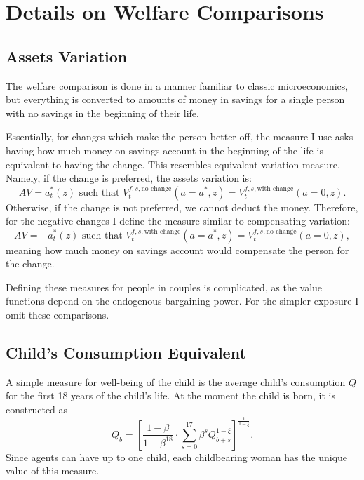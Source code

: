 \documentclass[12pt,letter]{article}
\begin{document}
\section{Details on Welfare Comparisons\label{welfare-details}}
\subsection{Assets Variation}
The welfare comparison is done in a manner familiar to classic microeconomics, but everything is converted to amounts of money in savings for a single person with no savings in the beginning of their life.

Essentially, for changes which make the person better off, the measure I use asks having how much money on savings account in the beginning of the life is equivalent to having the change. This resembles equivalent variation measure. Namely, if the change is preferred, the assets variation is:
\[AV = a^*_t(z) \text{ such that } V_{t}^{f,s,\text{no change}}(a=a^*,z) = V_{t}^{f,s,\text{with change}}(a=0,z).\]
Otherwise, if the change is not preferred, we cannot deduct the money. Therefore, for the negative changes I define the measure similar to compensating variation:
\[AV = -a^*_t(z) \text{ such that } V_{t}^{f,s,\text{with change}}(a=a^*,z) = V_{t}^{f,s,\text{no change}}(a=0,z),\]
meaning how much money on savings account would compensate the person for the change.

Defining these measures for people in couples is complicated, as the value functions depend on the endogenous bargaining power. For the simpler exposure I omit these comparisons.

\subsection{Child's Consumption Equivalent}
A simple measure for well-being of the child is the average child's consumption $Q$ for the first 18 years of the child's life. At the moment the child is born, it is constructed as
\[\bar{Q}_b =\left[ \frac{1 - \beta}{1 - \beta^{18}} \cdot \sum\limits_{s=0}^{17} \beta^s Q_{b+s}^{1-\xi}\right]^{\frac1{1-\xi}}.\]
Since agents can have up to one child, each childbearing woman has the unique value of this measure.
\end{document}
